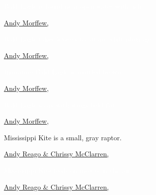 \documentclass[t]{beamer}
\begin{document}
{
\begin{frame}{\textcolor{white}{Bald Eagle is found near open water with fish.}}


\tinyfill \textcolor{white}{\href{https://www.flickr.com/photos/andymorffew/30742412415}{Andy Morffew, }}
\end{frame}
}

{
\begin{frame}{\textcolor{white}{Bald Eagle takes 5 years to attain adult plumage.}}


\tinyfill \textcolor{white}{\href{https://www.flickr.com/photos/andymorffew/30742412415}{Andy Morffew, }}
\end{frame}
}

{
\begin{frame}{\textcolor{white}{Immature Bald Eagle is mottled brown.}}


\tinyfill \textcolor{white}{\href{https://www.flickr.com/photos/andymorffew/46931504035}{Andy Morffew, }}
\end{frame}
}

{
\begin{frame}{\textcolor{white}{Bald Eagle soars with wings held flat.}}


\tinyfill \textcolor{white}{\href{https://www.flickr.com/photos/andymorffew/28687274768}{Andy Morffew, }}
\end{frame}
}

{
\begin{frame}{Mississippi Kite is a small, gray raptor.}


\tinyfill \textcolor{white}{\href{https://flickr.com/photos/wildreturn/28138609132}{Andy Reago \& Chrissy McClarren, }}
\end{frame}
}

{
\begin{frame}{\textcolor{white}{Mississippi Kite feeds on insects in the air.}}


\tinyfill \textcolor{white}{\href{https://flickr.com/photos/wildreturn/28138609132}{Andy Reago \& Chrissy McClarren, }}
\end{frame}
}
\end{document}
